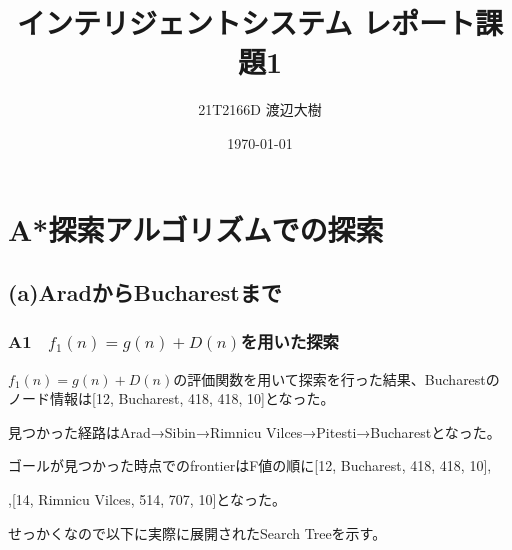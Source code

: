 \documentclass[a4paper,11pt,dvipdfmx]{jsarticle}
\begin{document}
\title{インテリジェントシステム レポート課題1}
\author{21T2166D 渡辺大樹}
\date{\today}
\maketitle
\section{A*探索アルゴリズムでの探索}
\subsection{(a)AradからBucharestまで}
\subsubsection{A1　$f_1(n)=g(n)+D(n)$を用いた探索}
$f_1(n)=g(n)+D(n)$の評価関数を用いて探索を行った結果、Bucharestのノード情報は[12, Bucharest, 418, 418, 10]となった。

見つかった経路はArad→Sibin→Rimnicu Vilces→Pitesti→Bucharestとなった。

ゴールが見つかった時点でのfrontierはF値の順に[12, Bucharest, 418, 418, 10],

\noindent
[13, Craiova, 455, 615, 10],[14, Rimnicu Vilces, 514, 707, 10]となった。

せっかくなので以下に実際に展開されたSearch Treeを示す。
\end{document}
